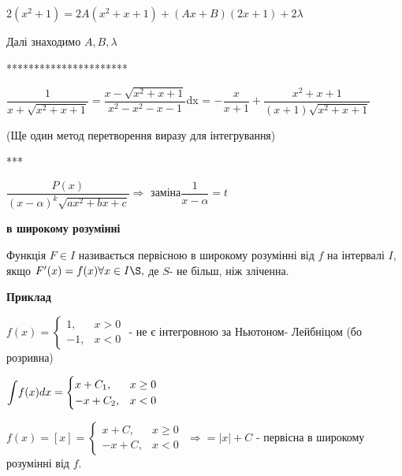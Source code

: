 \documentclass[12pt]{report}
\begin{document}
$2(x^2+1) = 2A (x^2+x+1)+ (Ax+B)(2x+1) +2\lambda$

\vspace{3 mm} 
Далі знаходимо $A, B, \lambda$

**********************
\vspace{5 mm} 

$ \dfrac{1}{x+\sqrt {x^2+x+1}}=  \dfrac{x-\sqrt{x^2+x+1}}{x^2 - x^2 - x- 1} $dx = $-\dfrac {x}{x+1} + \dfrac {x^2 +x +1}{(x+1)\sqrt{x^2+x+1}}$

(Ще один метод перетворення виразу для інтегрування)

***
\vspace{5 mm} 

$\dfrac{P(x)}{(x-\alpha)^k \sqrt{ax^2 + bx+c}} \Rightarrow $ заміна$  \dfrac{1}{x - \alpha} = t
$

	\begin{center}
	\textbf{ в широкому розумінні} 
\end{center}

Функція $F \in I $ називається первісною в широкому розумінні від $f$ на інтервалі $I$, якщо $F'(x) = f(x) \forall x \in I\S,$ де $S$- не більш, ніж зліченна.

\textbf{Приклад}

$f(x) = 
\begin{cases}
1,&  x >0  \\
-1, & x<0
\end{cases}$
- не є інтегровною за Ньютоном- Лейбніцом (бо розривна)

\vspace{5 mm} 

$\mathlarger\int f(x)dx = 
\begin{cases}
x+C_1,&  x \geq 0  \\
-x+C_2, & x<0
\end{cases}$


\vspace{5 mm} 
$ f(x) = [x] = \begin{cases}
x+C,&  x \geq 0  \\
-x+C, & x<0
\end{cases}$ $\Rightarrow = |x| + C $ - первісна в широкому розумінні від $f$.


  
 
\end{document}
